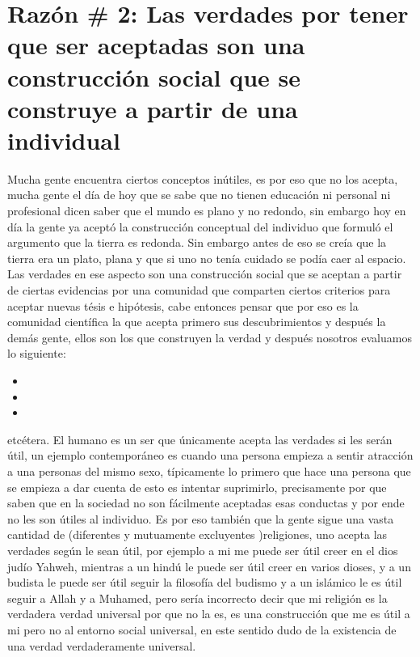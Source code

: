 \documentclass{article}
\begin{document}
\section{Razón \# 2: Las verdades por tener que ser aceptadas son una construcción social que se construye a partir de una individual}
Mucha gente encuentra ciertos conceptos inútiles, es por eso que no los acepta, mucha gente el día de hoy que se sabe que no tienen educación ni personal ni profesional dicen saber que el mundo es plano y no redondo, sin embargo hoy en día la gente ya aceptó la construcción conceptual del individuo que formuló el argumento que la tierra es redonda. 
Sin embargo antes de eso se creía que la tierra era un plato, plana y que si uno no tenía cuidado se podía caer al espacio. 
Las verdades en ese aspecto son una construcción social que se aceptan a partir de ciertas evidencias por una comunidad que comparten ciertos criterios para aceptar nuevas tésis e hipótesis, cabe entonces pensar que por eso es la comunidad científica la que acepta primero sus descubrimientos y después la demás gente, ellos son los que construyen la verdad y después nosotros evaluamos lo siguiente: \begin{itemize}
    \item {} 
    \item {}   
    \item {} 
\end{itemize} etcétera.
El humano es un ser que únicamente acepta las verdades si les serán útil, un ejemplo contemporáneo es cuando una persona empieza a sentir atracción a una personas del mismo sexo, típicamente lo primero que hace una persona que se empieza a dar cuenta de esto es intentar suprimirlo,  precisamente por que saben que en la sociedad no son fácilmente aceptadas esas conductas y por ende no les son útiles al individuo. Es por eso también que la gente sigue una vasta cantidad de (diferentes y mutuamente excluyentes )religiones, uno acepta las verdades según le sean útil, por ejemplo a mi me puede ser útil creer en el dios judío Yahweh, mientras a un hindú le puede ser útil creer en varios dioses, y a un budista le puede ser útil seguir la filosofía del budismo y a un islámico le es útil seguir a Allah y a Muhamed, pero sería incorrecto decir que mi religión es la verdadera verdad universal por que no la es, es una construcción que me es útil a mi pero no al entorno social universal, en este sentido dudo de la existencia de una verdad verdaderamente universal. 
\end{document}
